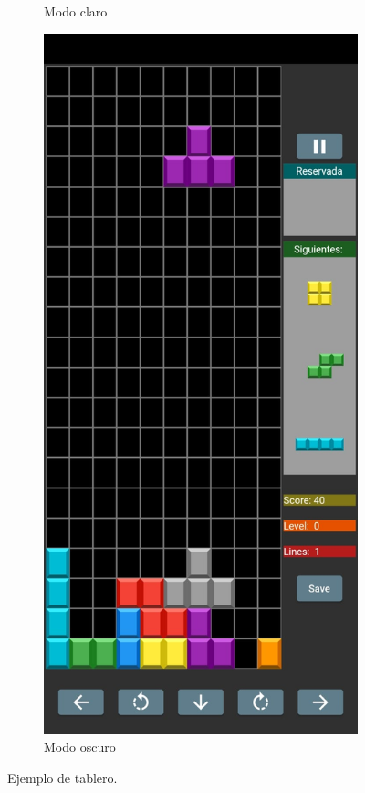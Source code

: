 \documentclass{article}
\begin{document}
\begin{figure}[H]
\begin{subfigure}{0.5\textwidth}
          \caption{Modo claro}
  \end{subfigure}
  \begin{subfigure}{0.5\textwidth}
          \includegraphics[width=\textwidth]{imagenes/captura2dark.jpeg}
          \caption{Modo oscuro}
  \end{subfigure}
  \caption{Ejemplo de tablero.}
\end{figure}
\end{document}
